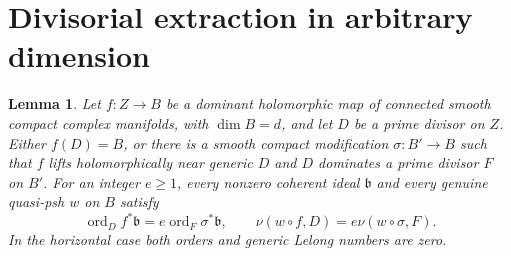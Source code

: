 \documentclass[11pt]{article}
\newcommand{\ord}{\operatorname{ord}}
\newtheorem{lemma}[theorem]{Lemma}
\theoremstyle{remark}\newtheorem{remark}[theorem]{Remark}
\begin{document}
\section{Divisorial extraction in arbitrary dimension}
\begin{lemma}\label{lem:extract}
Let $f:Z\to B$ be a dominant holomorphic map of connected smooth
compact complex manifolds, with $\dim B=d$, and let $D$ be a prime
divisor on $Z$. Either $f(D)=B$, or there is a smooth compact
modification $\sigma:B'\to B$ such that $f$ lifts holomorphically
near generic $D$ and $D$ dominates a prime divisor $F$ on $B'$.
For an integer $e\ge1$, every nonzero coherent ideal $\mathfrak b$
and every genuine quasi-psh $w$ on $B$ satisfy
\[
 \ord_D f^*\mathfrak b=e\ord_F\sigma^*\mathfrak b,
 \qquad \nu(w\circ f,D)=e\nu(w\circ\sigma,F).
 \tag{8}
\]
In the horizontal case both orders and generic Lelong numbers are zero.
\end{lemma}
\end{document}
